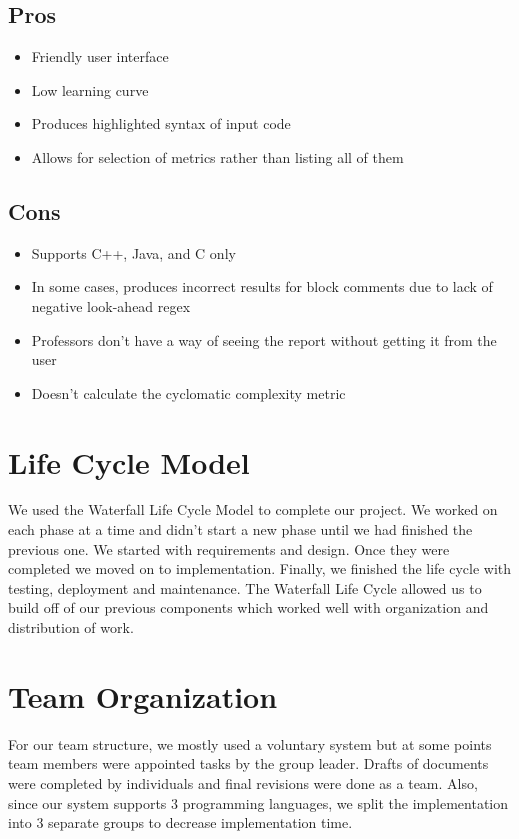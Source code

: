 \documentclass{scrreprt}
\begin{document}
	\section{Pros}
	\begin{itemize}
		\item Friendly user interface
		\item Low learning curve
		\item Produces highlighted syntax of input code
		\item Allows for selection of metrics rather than listing all of them
	\end{itemize}

	\section{Cons}
	\begin{itemize}
		\item Supports C++, Java, and C only
		\item In some cases, produces incorrect results for block comments due to lack of negative look-ahead regex
		\item Professors don't have a way of seeing the report without getting it from the user
		\item Doesn't calculate the cyclomatic complexity metric
	\end{itemize}

	{\let\clearpage\relax\pagebreak \chapter{Life Cycle Model}}
	We used the Waterfall Life Cycle Model to complete our project. We worked on each phase at a time and didn't start a new phase until we had finished the previous one. We started with requirements and design. Once they were completed we moved on to implementation. Finally, we finished the life cycle with testing, deployment and maintenance. The Waterfall Life Cycle allowed us to build off of our previous components which worked well with organization and distribution of work.

	{\let\clearpage\relax \chapter{Team Organization}}
	For our team structure, we mostly used a voluntary system but at some points team members were appointed tasks by the group leader. Drafts of documents were completed by individuals and final revisions were done as a team. Also, since our system supports 3 programming languages, we split the implementation into 3 separate groups to decrease implementation time.
	
\end{document}

